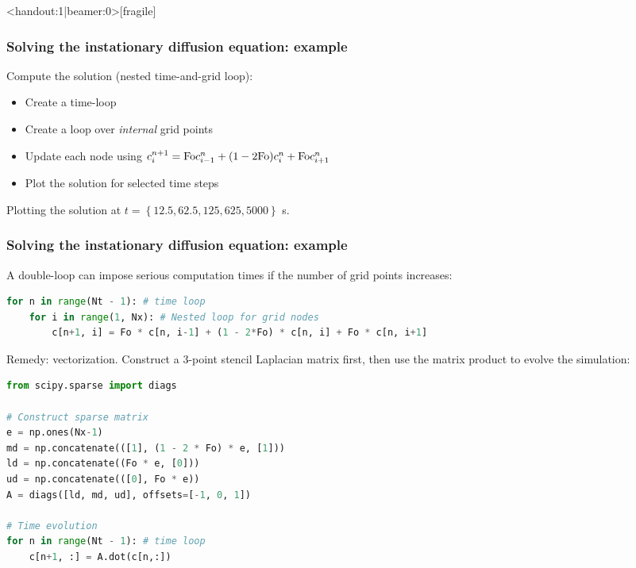 \begin{frame}<handout:1|beamer:0>[fragile]
  \frametitle{Solving the instationary diffusion equation: example}
  Compute the solution (nested time-and-grid loop):
  \begin{itemize}
      \item Create a time-loop
      \item Create a loop over \emph{internal} grid points
      \item Update each node using $c_i^{n+1} = \text{Fo} c_{i-1}^n + (1-2\text{Fo})c_i^n + \text{Fo} c_{i+1}^n$
      \item Plot the solution for selected time steps
  \end{itemize}
  \pause
  Plotting the solution at $t=\left\{12.5,62.5,125,625,5000\right\}$ \si{\second}.
\end{frame}

\begin{frame}[fragile]
  \frametitle{Solving the instationary diffusion equation: example}
  A double-loop can impose serious computation times if the number of grid points increases:
  \begin{lstlisting}[language=Python,basicstyle=\scriptsize\ttfamily]
for n in range(Nt - 1): # time loop
    for i in range(1, Nx): # Nested loop for grid nodes
        c[n+1, i] = Fo * c[n, i-1] + (1 - 2*Fo) * c[n, i] + Fo * c[n, i+1]
\end{lstlisting}
Remedy: vectorization. Construct a 3-point stencil Laplacian matrix first, then use the matrix product to evolve the simulation:
\begin{lstlisting}[language=Python,basicstyle=\scriptsize\ttfamily]
from scipy.sparse import diags

# Construct sparse matrix
e = np.ones(Nx-1)
md = np.concatenate(([1], (1 - 2 * Fo) * e, [1]))
ld = np.concatenate((Fo * e, [0]))
ud = np.concatenate(([0], Fo * e))
A = diags([ld, md, ud], offsets=[-1, 0, 1])

# Time evolution
for n in range(Nt - 1): # time loop
    c[n+1, :] = A.dot(c[n,:])
\end{lstlisting}
\end{frame}


